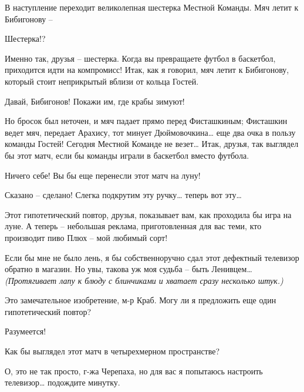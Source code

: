 \documentclass[../main.tex]{subfiles}
\begin{document}
\begin{dialogue}

 В наступление переходит великолепная шестерка Местной Команды. Мяч летит к Бибигонову \---

 Шестерка!?

 Именно так, друзья \--- шестерка. Когда вы превращаете футбол в баскетбол, приходится идти на компромисс! Итак, как я говорил, мяч летит к Бибигонову, который стоит неприкрытый вблизи от кольца Гостей.

 Давай, Бибигонов! Покажи им, где крабы зимуют!

 Но бросок был неточен, и мяч падает прямо перед Фисташкиным; Фисташкин ведет мяч, передает Арахису, тот минует Дюймовочкина\ldots{} еще два очка в пользу команды Гостей! Сегодня Местной Команде не везет\ldots{} Итак, друзья, так выглядел бы этот матч, если бы команды играли в баскетбол вместо футбола.

 Ничего себе! Вы бы еще перенесли этот матч на луну!

 Сказано \--- сделано! Слегка подкрутим эту ручку\ldots{} теперь вот эту\ldots{}


 Этот гипотетический повтор, друзья, показывает вам, как проходила бы игра на луне. А теперь \--- небольшая реклама, приготовленная для вас теми, кто производит пиво Плюх \--- мой любимый сорт!

 Если бы мне не было лень, я бы собственноручно сдал этот дефектный телевизор обратно в магазин. Но увы, такова уж моя судьба \--- быть Ленивцем\ldots{} \emph{(Протягивает лапу к блюду с блинчиками и хватает сразу несколько штук.)}

 Это замечательное изобретение, м-р Краб. Могу ли я предложить еще один гипотетический повтор?

 Разумеется!

 Как бы выглядел этот матч в четырехмерном пространстве?

 О, это не так просто, г-жа Черепаха, но для вас я попытаюсь настроить телевизор\ldots{} подождите минутку.


\end{dialogue}
\end{document}

